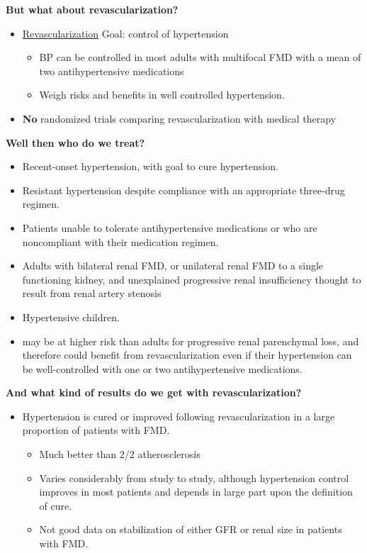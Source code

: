 \documentclass[
]{book}
\begin{document}
\textbf{But what about revascularization?}

\begin{itemize}
\item
  \uline{Revascularization} Goal: control of hypertension

  \begin{itemize}
  \item
    BP can be controlled in most adults with multifocal FMD with a
    mean of two antihypertensive medications
  \item
    Weigh risks and benefits in well controlled hypertension.
  \end{itemize}
\item
  \textbf{No} randomized trials comparing revascularization with medical
  therapy
\end{itemize}

\textbf{Well then who do we treat?}

\begin{itemize}
\item
  Recent-onset hypertension, with goal to cure hypertension.
\item
  Resistant hypertension despite compliance with an appropriate
  three-drug regimen.
\item
  Patients unable to tolerate antihypertensive medications or who are
  noncompliant with their medication regimen.
\item
  Adults with bilateral renal FMD, or unilateral renal FMD to a single
  functioning kidney, and unexplained progressive renal insufficiency
  thought to result from renal artery stenosis
\item
  Hypertensive children.
\item
  may be at higher risk than adults for progressive renal parenchymal
  loss, and therefore could benefit from revascularization even if
  their hypertension can be well-controlled with one or two
  antihypertensive medications.
\end{itemize}

\textbf{And what kind of results do we get with revascularization?}

\begin{itemize}
\item
  Hypertension is cured or improved following revascularization in a
  large proportion of patients with FMD.

  \begin{itemize}
  \item
    Much better than 2/2 atherosclerosis
  \item
    Varies considerably from study to study, although hypertension
    control improves in most patients and depends in large part upon
    the definition of cure.
  \item
    Not good data on stabilization of either GFR or renal size in
    patients with FMD.
  \end{itemize}
\end{itemize}
\end{document}

